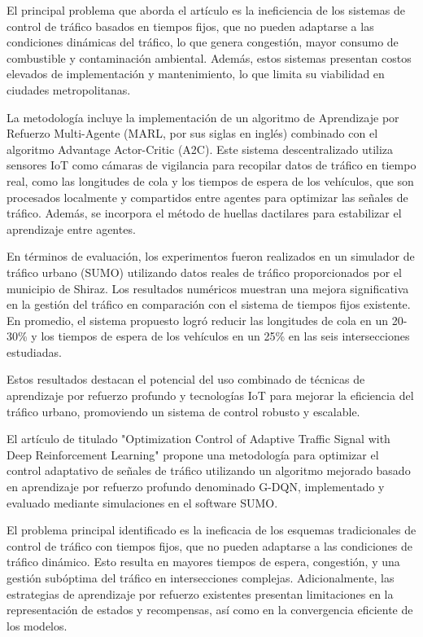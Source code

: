 El principal problema que aborda el artículo es la ineficiencia de los sistemas de control de tráfico basados en tiempos fijos, que no pueden adaptarse a las condiciones dinámicas del tráfico, lo que genera congestión, mayor consumo de combustible y contaminación ambiental. Además, estos sistemas presentan costos elevados de implementación y mantenimiento, lo que limita su viabilidad en ciudades metropolitanas.

La metodología incluye la implementación de un algoritmo de Aprendizaje por Refuerzo Multi-Agente (MARL, por sus siglas en inglés) combinado con el algoritmo Advantage Actor-Critic (A2C). Este sistema descentralizado utiliza sensores IoT como cámaras de vigilancia para recopilar datos de tráfico en tiempo real, como las longitudes de cola y los tiempos de espera de los vehículos, que son procesados localmente y compartidos entre agentes para optimizar las señales de tráfico. Además, se incorpora el método de huellas dactilares para estabilizar el aprendizaje entre agentes.

En términos de evaluación, los experimentos fueron realizados en un simulador de tráfico urbano (SUMO) utilizando datos reales de tráfico proporcionados por el municipio de Shiraz. Los resultados numéricos muestran una mejora significativa en la gestión del tráfico en comparación con el sistema de tiempos fijos existente. En promedio, el sistema propuesto logró reducir las longitudes de cola en un 20-30\% y los tiempos de espera de los vehículos en un 25\% en las seis intersecciones estudiadas.

Estos resultados destacan el potencial del uso combinado de técnicas de aprendizaje por refuerzo profundo y tecnologías IoT para mejorar la eficiencia del tráfico urbano, promoviendo un sistema de control robusto y escalable.

El artículo de \cite{Cao2024} titulado "Optimization Control of Adaptive Traffic Signal with Deep Reinforcement Learning" propone una metodología para optimizar el control adaptativo de señales de tráfico utilizando un algoritmo mejorado basado en aprendizaje por refuerzo profundo denominado G-DQN, implementado y evaluado mediante simulaciones en el software SUMO.

El problema principal identificado es la ineficacia de los esquemas tradicionales de control de tráfico con tiempos fijos, que no pueden adaptarse a las condiciones de tráfico dinámico. Esto resulta en mayores tiempos de espera, congestión, y una gestión subóptima del tráfico en intersecciones complejas. Adicionalmente, las estrategias de aprendizaje por refuerzo existentes presentan limitaciones en la representación de estados y recompensas, así como en la convergencia eficiente de los modelos.

